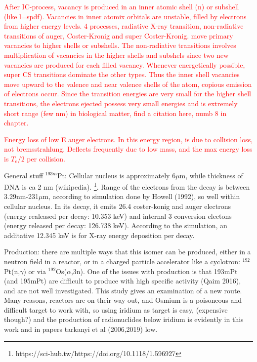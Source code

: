 \textcolor{red}{After IC-process, vacancy is produced in an inner atomic shell (n) or subshell (like l=spdf). Vacancies in inner atomix orbitals are unstable, filled by electrons from higher energy levels. 4 processes, radiative X-ray transition, non-radiative transitions of auger, Coster-Kronig and super Coster-Kronig. move primary vacancies to higher shells or subshells. The non-radiative transitions involves multiplication of vacancies in the higher shells and subshels since two new vacancies are produced for each filled vacancy. Whenever energetically possible, super CS transitions dominate the other types. Thus the inner shell vacancies move upward to the valence and near valence shells of the atom, copious emission of electrons occur. Since the transition energies are very small for the higher shell transitions, the electrons ejected possess very small energies and is extremely short range (few nm) in biological matter, find a citation here, numb 8 in chapter. }


\textcolor{red}{Energy loss of low E auger electrons. In this energy region, is due to collision loss, not bremsstrahlung. Deflects frequently due to low mass, and the max energy loss is $T_e/2$ per collision. }


General stuff $^{193m}$Pt: Cellular nucleus is approximately 6$\mu$m, while thickness of DNA is ca 2 nm (wikipedia). \footnote{https://sci-hub.tw/https://doi.org/10.1118/1.596927}. Range of the electrons from the decay is between 3.29nm-231$\mu$m, according to simulation done by Howell (1992), so well within cellular nucleus. In its decay, it emits 26.4 coster-konig and auger electrons (energy realeased per decay: 10.353 keV) and internal 3 conversion electons (energy released per decay: 126.738 keV). According to the simulation, an additative 12.345 keV is for X-ray energy deposition per decay. 

Production: there are multiple ways that this isomer can be produced, either in a neutron field in a reactor, or in a charged particle accelerator like a cyclotron: $^{192}$Pt(n,$\gamma$) or via $^{192}$Os($\alpha$,3n). One of the issues with production is that 193mPt (and 195mPt) are difficult to produce with high specific activity (Qaim 2016), and are not well investigated. This study gives an examination of a new route. Many reasons, reactors are on their way out, and Osmium is a poisoneous and difficult target to work with, so using iridium as target is easy, (expensive though?) and the production of radionuclides below iridium is evidently in this work and in papers tarkanyi et al (2006,2019) low. 

